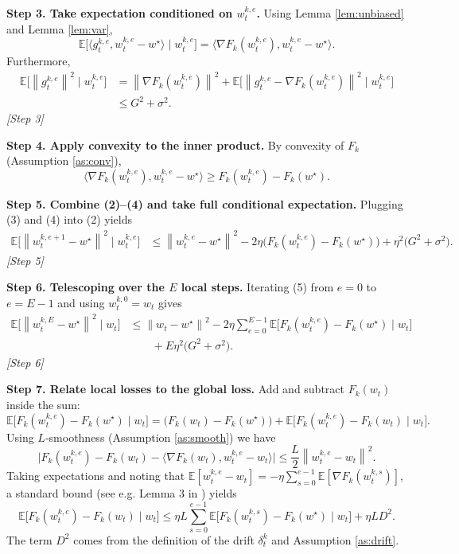 \documentclass{article}
\newcommand{\EE}{\mathbb{E}}
\newcommand{\norm}[1]{\left\lVert#1\right\rVert}
\newcommand{\grad}{\nabla}
\begin{document}
\bigskip
\noindent\textbf{Step 3. Take expectation conditioned on $w_{t}^{k,e}$.}  
Using Lemma \ref{lem:unbiased} and Lemma \ref{lem:var},
\[
\EE\!\bigl[\langle g_{t}^{k,e}, w_{t}^{k,e}-w^\star\rangle\mid w_{t}^{k,e}\bigr]
 =\langle \grad F_k(w_{t}^{k,e}), w_{t}^{k,e}-w^\star\rangle .
\]
Furthermore,
\begin{align}
\EE\!\bigl[\norm{g_{t}^{k,e}}^2\mid w_{t}^{k,e}\bigr]
&= \norm{\grad F_k(w_{t}^{k,e})}^2 + \EE\!\bigl[\norm{g_{t}^{k,e}-\grad F_k(w_{t}^{k,e})}^2\mid w_{t}^{k,e}\bigr] \nonumber\\
&\le G^2+\sigma^2 . \tag{3}
\end{align}
\textit{[Step 3]}

\bigskip
\noindent\textbf{Step 4. Apply convexity to the inner product.}  
By convexity of $F_k$ (Assumption \ref{as:conv}),
\[
\langle \grad F_k(w_{t}^{k,e}), w_{t}^{k,e}-w^\star\rangle
\ge F_k(w_{t}^{k,e})-F_k(w^\star) . \tag{4}
\]

\bigskip
\noindent\textbf{Step 5. Combine (2)–(4) and take full conditional expectation.}  
Plugging (3) and (4) into (2) yields
\begin{align}
\EE\!\bigl[\norm{w_{t}^{k,e+1}-w^\star}^2\mid w_{t}^{k,e}\bigr]
&\le \norm{w_{t}^{k,e}-w^\star}^2
 -2\eta\bigl(F_k(w_{t}^{k,e})-F_k(w^\star)\bigr)
 +\eta^2\bigl(G^2+\sigma^2\bigr). \tag{5}
\end{align}
\textit{[Step 5]}

\bigskip
\noindent\textbf{Step 6. Telescoping over the $E$ local steps.}  
Iterating (5) from $e=0$ to $e=E-1$ and using $w_{t}^{k,0}=w_t$ gives
\begin{align}
\EE\!\bigl[\norm{w_{t}^{k,E}-w^\star}^2\mid w_t\bigr]
&\le \norm{w_t-w^\star}^2
 -2\eta\sum_{e=0}^{E-1}\EE\!\bigl[F_k(w_{t}^{k,e})-F_k(w^\star)\mid w_t\bigr] \nonumber\\
&\qquad +E\eta^2\bigl(G^2+\sigma^2\bigr). \tag{6}
\end{align}
\textit{[Step 6]}

\bigskip
\noindent\textbf{Step 7. Relate local losses to the global loss.}  
Add and subtract $F_k(w_t)$ inside the sum:
\[
\EE\!\bigl[F_k(w_{t}^{k,e})-F_k(w^\star)\mid w_t\bigr]
= \bigl(F_k(w_t)-F_k(w^\star)\bigr)
   + \EE\!\bigl[F_k(w_{t}^{k,e})-F_k(w_t)\mid w_t\bigr].
\]
Using $L$‑smoothness (Assumption \ref{as:smooth}) we have
\[
\bigl|F_k(w_{t}^{k,e})-F_k(w_t)-\langle\grad F_k(w_t),w_{t}^{k,e}-w_t\rangle\bigr|
\le \frac{L}{2}\norm{w_{t}^{k,e}-w_t}^2 .
\]
Taking expectations and noting that $\EE[w_{t}^{k,e}-w_t]=-\eta\sum_{s=0}^{e-1}\EE[\grad F_k(w_{t}^{k,s})]$, a standard bound (see e.g. Lemma 3 in \cite{stich2018local}) yields
\[
\EE\!\bigl[F_k(w_{t}^{k,e})-F_k(w_t)\mid w_t\bigr]
\le \eta L\sum_{s=0}^{e-1}\EE\!\bigl[F_k(w_{t}^{k,s})-F_k(w^\star)\mid w_t\bigr] + \eta L D^2 . \tag{7}
\]
The term $D^2$ comes from the definition of the drift $\delta_t^k$ and Assumption \ref{as:drift}.
\end{document}
